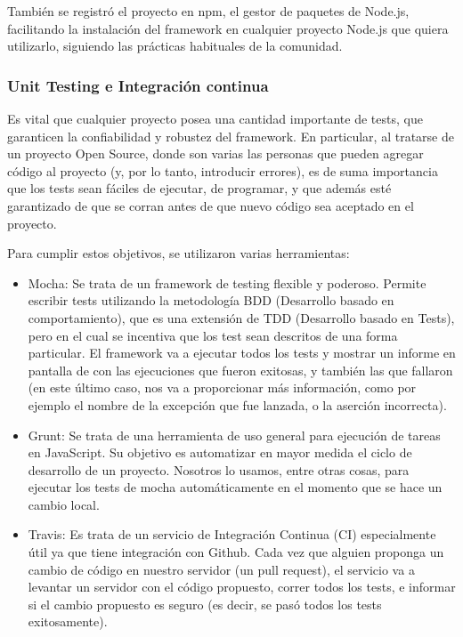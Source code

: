 \documentclass[doc,helv,longtable]{article}
\begin{document}
También se registró el proyecto en npm, el gestor de paquetes de Node.js, facilitando la instalación del framework en cualquier proyecto Node.js que quiera utilizarlo, siguiendo las prácticas habituales de la comunidad.

\subsubsection{Unit Testing e Integración continua}
Es vital que cualquier proyecto posea una cantidad importante de tests, que garanticen la confiabilidad y robustez del framework. En particular, al tratarse de un proyecto Open Source, donde son varias las personas que pueden agregar código al proyecto (y, por lo tanto, introducir errores), es de suma importancia que los tests sean fáciles de ejecutar, de programar, y que además esté garantizado de que se corran antes de que nuevo código sea aceptado en el proyecto.

Para cumplir estos objetivos, se utilizaron varias herramientas:
\begin{itemize}
\item  Mocha\cite{mocha}: Se trata de un framework de testing flexible y poderoso. Permite escribir tests utilizando la metodología BDD (Desarrollo basado en comportamiento), que es una extensión de TDD (Desarrollo basado en Tests), pero en el cual se incentiva que los test sean descritos de una forma particular. El framework va a ejecutar todos los tests y mostrar un informe en pantalla de con las ejecuciones que fueron exitosas, y también las que fallaron (en este último caso, nos va a proporcionar más información, como por ejemplo el nombre de la excepción que fue lanzada, o la aserción incorrecta).
\item  Grunt\cite{grunt}: Se trata de una herramienta de uso general para ejecución de tareas en JavaScript. Su objetivo es automatizar en mayor medida el ciclo de desarrollo de un proyecto. Nosotros lo usamos, entre otras cosas, para ejecutar los tests de mocha automáticamente en el momento que se hace un cambio local.
\item  Travis\cite{travis}: Es trata de un servicio de Integración Continua (CI) especialmente útil ya que tiene integración con Github. Cada vez que alguien proponga un cambio de código en nuestro servidor (un pull request), el servicio va a levantar un servidor con el código propuesto, correr todos los tests, e informar si el cambio propuesto es seguro (es decir, se pasó todos los tests exitosamente).  

\end{itemize}
\end{document}
